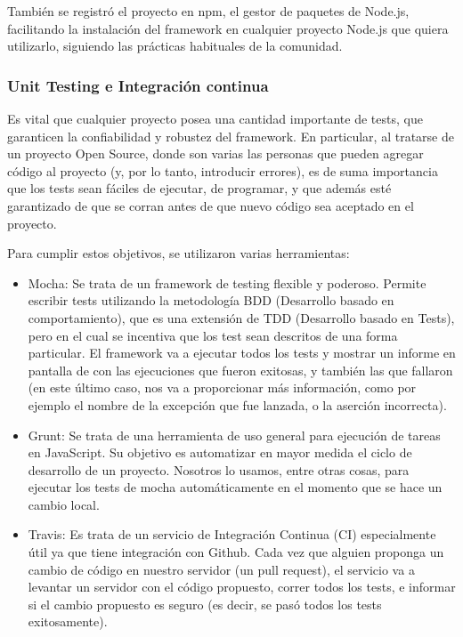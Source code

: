 \documentclass[doc,helv,longtable]{article}
\begin{document}
También se registró el proyecto en npm, el gestor de paquetes de Node.js, facilitando la instalación del framework en cualquier proyecto Node.js que quiera utilizarlo, siguiendo las prácticas habituales de la comunidad.

\subsubsection{Unit Testing e Integración continua}
Es vital que cualquier proyecto posea una cantidad importante de tests, que garanticen la confiabilidad y robustez del framework. En particular, al tratarse de un proyecto Open Source, donde son varias las personas que pueden agregar código al proyecto (y, por lo tanto, introducir errores), es de suma importancia que los tests sean fáciles de ejecutar, de programar, y que además esté garantizado de que se corran antes de que nuevo código sea aceptado en el proyecto.

Para cumplir estos objetivos, se utilizaron varias herramientas:
\begin{itemize}
\item  Mocha\cite{mocha}: Se trata de un framework de testing flexible y poderoso. Permite escribir tests utilizando la metodología BDD (Desarrollo basado en comportamiento), que es una extensión de TDD (Desarrollo basado en Tests), pero en el cual se incentiva que los test sean descritos de una forma particular. El framework va a ejecutar todos los tests y mostrar un informe en pantalla de con las ejecuciones que fueron exitosas, y también las que fallaron (en este último caso, nos va a proporcionar más información, como por ejemplo el nombre de la excepción que fue lanzada, o la aserción incorrecta).
\item  Grunt\cite{grunt}: Se trata de una herramienta de uso general para ejecución de tareas en JavaScript. Su objetivo es automatizar en mayor medida el ciclo de desarrollo de un proyecto. Nosotros lo usamos, entre otras cosas, para ejecutar los tests de mocha automáticamente en el momento que se hace un cambio local.
\item  Travis\cite{travis}: Es trata de un servicio de Integración Continua (CI) especialmente útil ya que tiene integración con Github. Cada vez que alguien proponga un cambio de código en nuestro servidor (un pull request), el servicio va a levantar un servidor con el código propuesto, correr todos los tests, e informar si el cambio propuesto es seguro (es decir, se pasó todos los tests exitosamente).  

\end{itemize}
\end{document}
